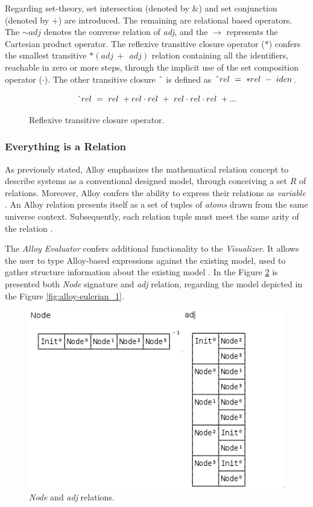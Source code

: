 Regarding set-theory, set intersection (denoted by $\&$) and set conjunction (denoted by $+$) are introduced. The remaining are relational based operators. The $\sim adj$ denotes the converse relation of \textit{adj}, and the $\rightarrow$ represents the Cartesian product operator. The reflexive transitive closure operator ($\ast$) confers the
smallest transitive $\ast(adj\ +\ ~adj)$ relation containing all the identifiers, reachable in zero or more steps, through the implicit use of the set composition operator ($\cdot$). The other transitive closure $\string^$ is defined as $\string^ rel\ =\ \ast rel\ -\ iden$.

\begin{figure}[H]
    \[\string^ rel\ =\ rel\ + rel \cdot rel\ +\ rel \cdot rel \cdot rel\ + ... \]  
\caption{Reflexive transitive closure operator.}
\label{math:alloy-transitive}
\end{figure}

\subsubsection{Everything is a Relation}

As previously stated, Alloy emphasizes the mathematical relation concept to describe systems as a conventional designed model, through conceiving a set $R$ of relations. Moreover, Alloy confers the ability to express their relations as \textit{variable} \cite{lwspecification}. An Alloy relation presents itself as a set of tuples of \textit{atoms} drawn from the same universe context. Subsequently, each relation tuple must meet the same arity of the relation \cite{alloy-docs}.

The \textit{Alloy Evaluator} \cite{alloy-6} confers additional functionality to the \textit{Visualizer}. It allows the user to type Alloy-based expressions against the existing model, used to gather structure information about the existing model \cite{alloy-docs}. In the Figure \ref{fig:alloy-evaluator_1} is presented both \textit{Node} signature and \textit{adj} relation, regarding the model depicted in the Figure \ref{fig:alloy-eulerian_1}.

\begin{figure}[H]
    \centering
    \includegraphics[width=0.5\linewidth]{img/alloy_evaluator1.png}
    \caption{\textit{Node} and \textit{adj} relations.}
    \label{fig:alloy-evaluator_1}
\end{figure}

